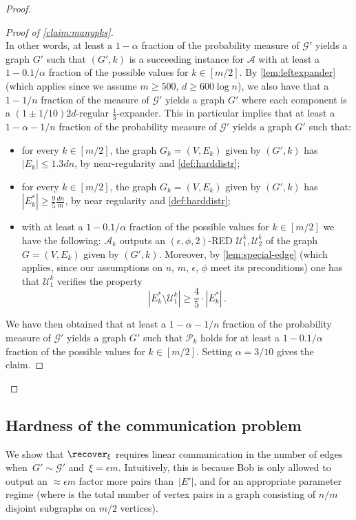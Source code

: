 \begin{proof}
\begin{proof}[Proof of \cref{claim:manypks}]
\begin{equation*}
		\end{equation*}
		In other words, at least a $1-\alpha$ fraction of the probability measure of $\mathcal{G}'$ yields a graph $G'$ such that $(G',k)$ is a succeeding instance for $\mathcal{A}$ with at least a $1-0.1/\alpha$ fraction of the possible values for $k \in [m/2]$. By \cref{lem:leftexpander} (which applies since we assume $m\ge 500$, $d \ge 600 \log n$), we also have that a $1-1/n$ fraction of the measure of $\mathcal{G}'$ yields a graph $G'$ where each component is a $(1 \pm 1/10)2d$-regular $\frac{1}{3}$-expander. This in particular implies that at least a $1-\alpha-1/n$ fraction of the probability measure of $\mathcal{G}'$ yields a graph $G'$ such that:
		\begin{itemize}
			\item for every $k \in [m/2]$, the graph $G_k=(V,E_k)$ given by $(G',k)$ has $|E_k| \le 1.3 dn$, by near-regularity and \cref{def:harddistr};
			\item for every $k \in [m/2]$, the graph $G_k=(V,E_k)$ given by $(G',k)$ has $|E^*_k| \ge \frac{9}{5} \frac{dn}{m}$, by near regularity and \cref{def:harddistr};
			\item with at least a $1-0.1/\alpha$ fraction of the possible values for $k \in [m/2]$ we have the following: $\mathcal{A}_k$ outputs an $(\epsilon,\phi,2)$-RED $\mathcal{U}^k_1,\mathcal{U}^k_2$ of the graph $G=(V,E_k)$ given by $(G',k)$. Moreover, by \cref{lem:special-edge} (which applies, since our assumptions on $n$, $m$, $\epsilon$, $\phi$ meet its preconditions) one has that $\mathcal{U}_1^k$ verifies the property
			\begin{equation*}
				\left| E^*_k \setminus \mathcal{U}^k_1\right| \ge \frac{4}{5} \cdot \left|E^*_k\right|  \, .
			\end{equation*}
		\end{itemize}
		We have then obtained that at least a $1-\alpha-1/n$ fraction of the probability measure of $\mathcal{G}'$ yields a graph $G'$ such that $\mathcal{P}_k$ holds for at least a $1-0.1/\alpha$ fraction of the possible values for $k \in [m/2]$. Setting $\alpha = 3/10$ gives the claim.
	\end{proof}
\end{proof}

\subsection{Hardness of the communication problem}
\label{subsec:hardcomm}
We show that $\recover_{\xi}$ requires linear communication in the number of edges when~$G' \sim \mathcal{G}'$ and~$\xi = \epsilon m$. Intuitively, this is because Bob is only allowed to output an $\approx \epsilon m$ factor more pairs than~$|E'|$, and for an appropriate parameter regime  (where  is the total number of vertex pairs in a graph consisting of $n/m$ disjoint subgraphs on $m/2$ vertices).

